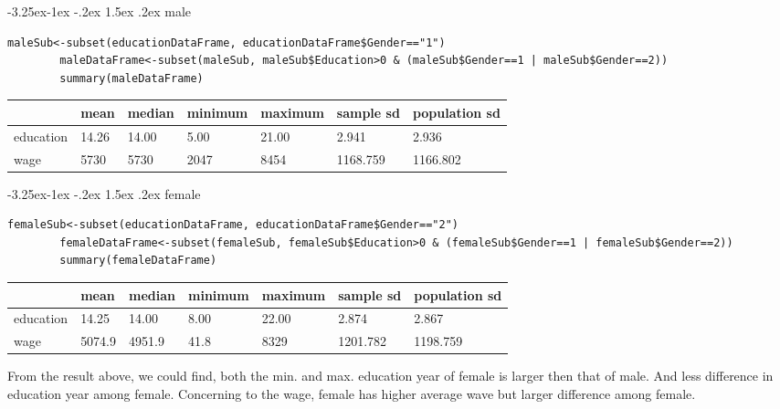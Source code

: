 \documentclass[12pt]{article}
\makeatletter
\renewcommand\subsection{\@startsection{subsection}{2}{\z@}%
	{-3.25ex\@plus -1ex \@minus -.2ex}%
	{1.5ex \@plus .2ex}%
	{\normalfont\large\bfseries}}%
\makeatother
\begin{document}
	\subsection{male}
	\begin{lstlisting}[breaklines=true]
		maleSub<-subset(educationDataFrame, educationDataFrame$Gender=="1")
		maleDataFrame<-subset(maleSub, maleSub$Education>0 & (maleSub$Gender==1 | maleSub$Gender==2))
		summary(maleDataFrame)
	\end{lstlisting}
	\begin{table}[htbp]
		\centering
		\label{my-label}
		\begin{tabular}{l|l|l|l|l|l|l}
			\hline
			          & mean   & median & minimum & maximum & sample sd & population sd \\
			\hline
			education & 14.26  & 14.00  & 5.00    & 21.00   & 2.941     & 2.936\\
			\hline
			wage      & 5730   & 5730   & 2047    & 8454    & 1168.759  & 1166.802\\
			\hline
		\end{tabular}
	\end{table}

	\subsection{female}
	\begin{lstlisting}[breaklines=true]
		femaleSub<-subset(educationDataFrame, educationDataFrame$Gender=="2")
		femaleDataFrame<-subset(femaleSub, femaleSub$Education>0 & (femaleSub$Gender==1 | femaleSub$Gender==2))
		summary(femaleDataFrame)
	\end{lstlisting}
	\begin{table}[htbp]
	\centering
	\label{my-label}
	\begin{tabular}{l|l|l|l|l|l|l}
		\hline
	              & mean   & median & minimum & maximum & sample sd & population sd \\
		\hline
		education & 14.25  & 14.00  & 8.00    & 22.00   & 2.874     & 2.867\\
		\hline
		wage      & 5074.9 & 4951.9 & 41.8    & 8329    & 1201.782  & 1198.759\\
		\hline
	\end{tabular}
	\end{table}
	\noindent
	From the result above, we could find, both the min. and max. education year of female is larger then that of male. And less difference in education year among female. Concerning to the wage, female has higher average wave but larger difference among female.\\
	

	
	
\end{document}
